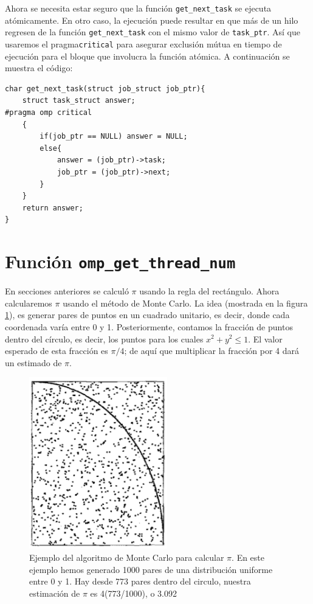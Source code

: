 \documentclass[12pt,letterpaper]{book}
\begin{document}
Ahora se necesita estar seguro que la función \texttt{get\_next\_task} se ejecuta atómicamente. En otro caso, la ejecución puede resultar en que más de un hilo regresen de la función \texttt{get\_next\_task} con el mismo valor de \texttt{task\_ptr}.
Así que usaremos el pragma\texttt{critical} para asegurar exclusión mútua en tiempo de ejecución para el bloque que involucra la función atómica. A continuación se muestra el código:

\begin{lstlisting}[style=C]
char get_next_task(struct job_struct job_ptr){
	struct task_struct answer;
#pragma omp critical
	{
		if(job_ptr == NULL) answer = NULL;
		else{
			answer = (job_ptr)->task;
			job_ptr = (job_ptr)->next;
		}
	}
	return answer;
}
\end{lstlisting}

\section{Función \texttt{omp\_get\_thread\_num}}
En secciones anteriores se calculó $\pi$ usando la regla del rectángulo. Ahora calcularemos $\pi$ usando el método de Monte Carlo. La idea (mostrada en la figura \ref{fig:pi_montecarlo}), es generar pares de puntos en un cuadrado unitario, es decir, donde cada coordenada varía entre 0 y 1. Posteriormente, contamos la fracción de puntos dentro del círculo, es decir, los puntos para los cuales $x^2 + y^2 \leq 1$. El valor esperado de esta fracción es $\pi / 4$; de aquí que multiplicar la fracción por 4 dará un estimado de $\pi$.

\begin{figure}
\begin{center}
\includegraphics[width=6cm]{../imagenes/pi_montecarlo.png} 
\end{center}
\caption{ Ejemplo del algoritmo de Monte Carlo para calcular $\pi$. En este ejemplo hemos generado 1000 pares de una distribución uniforme entre 0 y 1. Hay desde 773 pares dentro del circulo, nuestra estimación de $\pi$ es 4(773/1000), o 3.092}
\label{fig:pi_montecarlo}
\end{figure}
\end{document}
